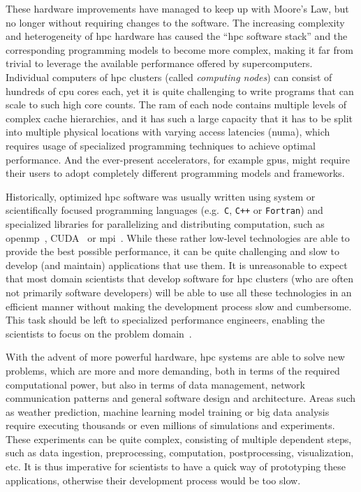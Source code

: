 These hardware improvements have managed to keep up with Moore's Law, but no longer without
requiring changes to the software. The increasing complexity and heterogeneity of
\gls{hpc} hardware has caused the ``\gls{hpc} software stack'' and the
corresponding programming models to become more complex, making it far from trivial to leverage the
available performance offered by supercomputers. Individual computers of \gls{hpc}
clusters (called \emph{computing nodes}) can consist of hundreds of \gls{cpu} cores
each, yet it is quite challenging to write programs that can scale to such high core counts. The
\gls{ram} of each node contains multiple levels of complex cache hierarchies, and it
has such a large capacity that it has to be split into multiple physical locations with varying
access latencies (\gls{numa}), which requires usage of specialized programming
techniques to achieve optimal performance. And the ever-present accelerators, for example
\glspl{gpu}, might require their users to adopt completely different programming models
and frameworks.

Historically, optimized \gls{hpc} software was usually written using system or
scientifically focused programming languages (e.g.~\texttt{C}, \texttt{C++}
or \texttt{Fortran}) and specialized libraries for parallelizing and distributing
computation, such as \gls{openmp}~\cite{openmp}, CUDA~\cite{cuda} or
\gls{mpi}~\cite{mpistudy}. While these rather low-level technologies are able
to provide the best possible performance, it can be quite challenging and slow to develop (and
maintain) applications that use them. It is unreasonable to expect that most domain scientists that
develop software for \gls{hpc} clusters (who are often not primarily software
developers) will be able to use all these technologies in an efficient manner without making the
development process slow and cumbersome. This task should be left to specialized performance
engineers, enabling the scientists to focus on the problem domain~\cite{dace}.

With the advent of more powerful hardware, \gls{hpc} systems are able to solve new
problems, which are more and more demanding, both in terms of the required computational power, but
also in terms of data management, network communication patterns and general software design and
architecture. Areas such as weather prediction, machine learning model training or big data
analysis require executing thousands or even millions of simulations and experiments. These
experiments can be quite complex, consisting of multiple dependent steps, such as data ingestion,
preprocessing, computation, postprocessing, visualization, etc. It is thus imperative for
scientists to have a quick way of prototyping these applications, otherwise their development
process would be too slow.


